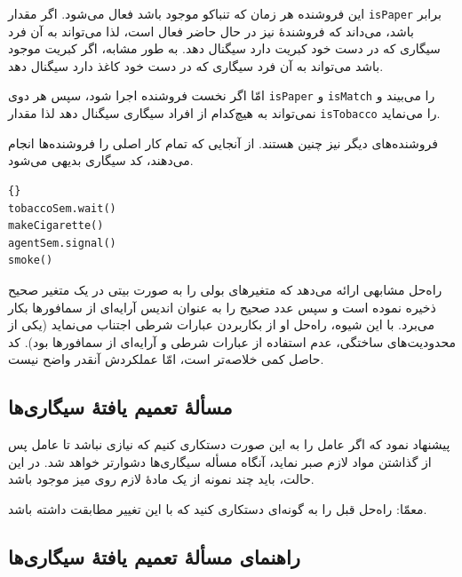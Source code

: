 \documentclass{book}
\newcommand{\clearemptydoublepage}{\newpage\cleardoublepage}
\begin{document}
    این فروشنده هر زمان که تنباکو موجود باشد فعال می‌شود. اگر مقدار {\tt isPaper} برابر  باشد، می‌داند که فروشندهٔ‌  نیز در حال 
    حاضر فعال است، لذا می‌تواند به آن فرد سیگاری که در دست خود کبریت دارد سیگنال دهد. به طور مشابه، اگر کبریت موجود باشد می‌تواند به آن فرد 
    سیگاری که در دست خود کاغذ دارد سیگنال دهد. 

    امّا اگر نخست فروشنده  اجرا شود، سپس هر دوی {\tt isPaper} و  {\tt isMatch}  را  می‌بیند و نمی‌تواند به هیچ‌کدام از افراد 
    سیگاری سیگنال دهد لذا مقدار  {\tt isTobacco} را   می‌نماید. 

    فروشنده‌های دیگر نیز چنین هستند. از آنجایی که  تمام کار اصلی را فروشنده‌ها انجام می‌دهند، کد سیگاری بدیهی می‌شود.

\begin{latin}
\begin{lstlisting}[title=\rl{سیگاری تنباکو‌دار}]{}
tobaccoSem.wait()
makeCigarette()
agentSem.signal()
smoke()
\end{lstlisting}
\end{latin}

    راه‌حل مشابهی ارائه می‌دهد که متغیرهای بولی را به صورت بیتی در یک متغیر صحیح ذخیره نموده است و سپس عدد صحیح را به عنوان 
    اندیس آرایه‌ای از سمافورها بکار می‌برد. با این شیوه، راه‌حل او از بکاربردن عبارات شرطی اجتناب می‌نماید (یکی از محدودیت‌های ساختگی، عدم استفاده 
    از عبارات شرطی و آرایه‌ای از سمافورها بود). 
    کد حاصل کمی خلاصه‌تر است، امّا عملکردش آنقدر واضح نیست. 
    

\subsection{ مسألهٔ تعمیم یافتهٔ سیگاری‌ها}

     پیشنهاد نمود که اگر عامل را به این صورت دستکاری کنیم
     که نیازی نباشد تا عامل پس از گذاشتن مواد لازم صبر نماید، آنگاه مسأله سیگاری‌ها دشوارتر خواهد شد. 
    در این حالت، باید چند نمونه از یک مادهٔ لازم روی میز موجود باشد. 

    معمّا: راه‌حل قبل را به گونه‌ای دستکاری کنید که با این تغییر مطابقت داشته باشد. 

\clearemptydoublepage
\subsection{راهنمای مسألهٔ تعمیم یافتهٔ سیگاری‌ها}
\end{document}

